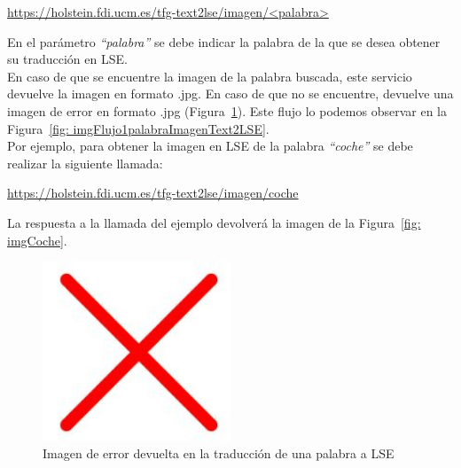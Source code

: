 \begin{shaded}
	\url{https://holstein.fdi.ucm.es/tfg-text2lse/imagen/<palabra> }	
\end{shaded}

En el parámetro \textit{``palabra''} se debe indicar la palabra de la que se desea obtener su traducción en LSE. \\

En caso de que se encuentre la imagen de la palabra buscada, este servicio devuelve la imagen en formato .jpg. En caso de que no se encuentre, devuelve una imagen de error en formato .jpg (Figura~\ref {fig: imgError}). Este flujo lo podemos observar en la Figura~\ref {fig: imgFlujo1palabraImagenText2LSE}. \\

Por ejemplo, para obtener la imagen en LSE de la palabra \textit{``coche''} se debe realizar la siguiente llamada:

\begin{shaded}
	\url{https://holstein.fdi.ucm.es/tfg-text2lse/imagen/coche }	
\end{shaded}

La respuesta a la llamada del ejemplo devolverá la imagen de la Figura~\ref {fig: imgCoche}.

\begin{figure}[]
	\centering
	\includegraphics[width=0.5\textwidth]{Imagenes/Fuentes/Text2LSE/imgError.jpg}
	\caption{Imagen de error devuelta en la traducción de una palabra a LSE}
	\label {fig: imgError}
\end{figure}

